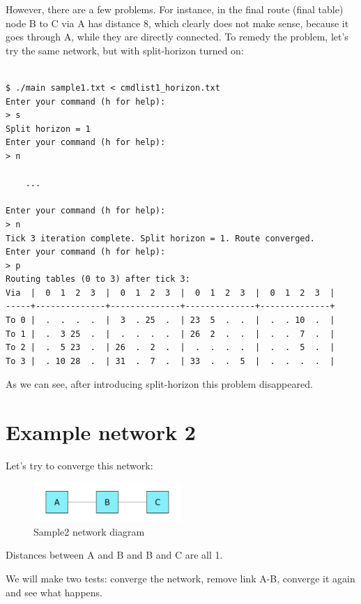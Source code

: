 \documentclass[english,11pt]{article}
\newcommand{\ok}{\fontsize{9}{11}\selectfont}
\begin{document}
However, there are a few problems. For instance, in the final route (final
table) node B to C via A has distance 8, which clearly does not make sense,
because it goes through A, while they are directly connected. To remedy the
problem, let's try the same network, but with split-horizon turned on:

{\ok
\begin{verbatim}

$ ./main sample1.txt < cmdlist1_horizon.txt
Enter your command (h for help):
> s
Split horizon = 1
Enter your command (h for help):
> n

    ...

Enter your command (h for help):
> n
Tick 3 iteration complete. Split horizon = 1. Route converged.
Enter your command (h for help):
> p
Routing tables (0 to 3) after tick 3:
Via  |  0  1  2  3  |  0  1  2  3  |  0  1  2  3  |  0  1  2  3  |
-----+--------------+--------------+--------------+--------------+
To 0 |  .  .  .  .  |  3  . 25  .  | 23  5  .  .  |  .  . 10  .  |
To 1 |  .  3 25  .  |  .  .  .  .  | 26  2  .  .  |  .  .  7  .  |
To 2 |  .  5 23  .  | 26  .  2  .  |  .  .  .  .  |  .  .  5  .  |
To 3 |  . 10 28  .  | 31  .  7  .  | 33  .  .  5  |  .  .  .  .  |
\end{verbatim}
}

As we can see, after introducing split-horizon this problem disappeared.

\section{Example network 2}

Let's try to converge this network:

\begin{figure}[h!]
    \label{img:sample1.png}
    \begin{center}
        \includegraphics[width=0.5\textwidth]{sample2}
    \end{center}
    \caption{Sample2 network diagram}
\end{figure}

Distances between A and B and B and C are all 1.

We will make two tests: converge the network, remove link A-B, converge it again
and see what happens.
\end{document}
